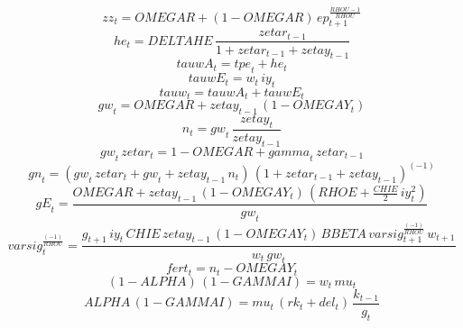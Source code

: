 \begin{dmath}
{zz}_{t}={OMEGAR}+\left(1-{OMEGAR}\right)\, {ep}_{t+1}^{\frac{{RHOU}-1}{{RHOU}}}
\end{dmath}
\begin{dmath}
{he}_{t}={DELTAHE}\, \frac{{zetar}_{t-1}}{1+{zetar}_{t-1}+{zetay}_{t-1}}
\end{dmath}
\begin{dmath}
{tauwA}_{t}={tpe}_{t}+{he}_{t}
\end{dmath}
\begin{dmath}
{tauwE}_{t}={w}_{t}\, {iy}_{t}
\end{dmath}
\begin{dmath}
{tauw}_{t}={tauwA}_{t}+{tauwE}_{t}
\end{dmath}
\begin{dmath}
{gw}_{t}={OMEGAR}+{zetay}_{t-1}\, \left(1-{OMEGAY}_{t}\right)
\end{dmath}
\begin{dmath}
{n}_{t}={gw}_{t}\, \frac{{zetay}_{t}}{{zetay}_{t-1}}
\end{dmath}
\begin{dmath}
{gw}_{t}\, {zetar}_{t}=1-{OMEGAR}+{gamma}_{t}\, {zetar}_{t-1}
\end{dmath}
\begin{dmath}
{gn}_{t}=\left({gw}_{t}\, {zetar}_{t}+{gw}_{t}+{zetay}_{t-1}\, {n}_{t}\right)\, \left(1+{zetar}_{t-1}+{zetay}_{t-1}\right)^{\left(-1\right)}
\end{dmath}
\begin{dmath}
{gE}_{t}=\frac{{OMEGAR}+{zetay}_{t-1}\, \left(1-{OMEGAY}_{t}\right)\, \left({RHOE}+\frac{{CHIE}}{2}\, {iy}_{t}^{2}\right)}{{gw}_{t}}
\end{dmath}
\begin{dmath}
{varsig}_{t}^{\frac{\left(-1\right)}{{RHOU}}}=\frac{{g}_{t+1}\, {iy}_{t}\, {CHIE}\, {zetay}_{t-1}\, \left(1-{OMEGAY}_{t}\right)\, {BBETA}\, {varsig}_{t+1}^{\frac{\left(-1\right)}{{RHOU}}}\, {w}_{t+1}}{{w}_{t}\, {gw}_{t}}
\end{dmath}
\begin{dmath}
{fert}_{t}={n}_{t}-{OMEGAY}_{t}
\end{dmath}
\begin{dmath}
\left(1-{ALPHA}\right)\, \left(1-{GAMMAI}\right)={w}_{t}\, {mu}_{t}
\end{dmath}
\begin{dmath}
{ALPHA}\, \left(1-{GAMMAI}\right)={mu}_{t}\, \left({rk}_{t}+{del}_{t}\right)\, \frac{{k}_{t-1}}{{g}_{t}}
\end{dmath}
